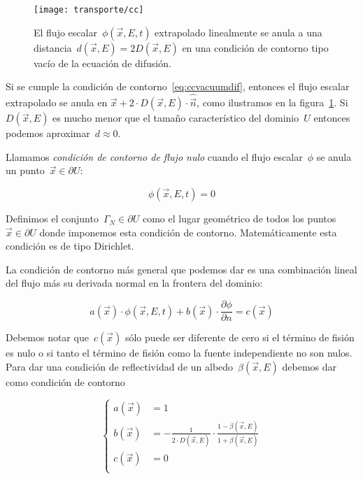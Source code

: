 \begin{figure}
\begin{center}
 \texttt{[image: transporte/cc]}
\end{center}
\caption{\label{fig:cc} El flujo escalar~$\phi(\vec{x}, E,t)$ extrapolado linealmente se anula a una distancia~$d(\vec{x},E)= 2D(\vec{x},E)$ en una condición de contorno tipo vacío de la ecuación de difusión.}
\end{figure}

Si se cumple la condición de contorno~\eqref{eq:ccvacuumdif}, entonces el flujo escalar extrapolado se anula en $\vec{x} + 2 \cdot D(\vec{x}, E) \cdot \hat{\vec{n}}$, como ilustramos en la figura~\ref{fig:cc}. Si~$D(\vec{x}, E)$ es mucho menor que el tamaño característico del dominio~$U$ entonces podemos aproximar~$d \approx 0$.

\begin{definicion}
\label{def:ccnulldif}
Llamamos \emph{condición de contorno de flujo nulo} cuando el flujo escalar~$\phi$ se anula un punto~$\vec{x} \in \partial U$:

\begin{equation*}
\phi(\vec{x}, E, t) = 0
\end{equation*}

Definimos el conjunto~$\Gamma_N \in \partial U$ como el lugar geométrico de todos los puntos~$\vec{x} \in \partial U$ donde imponemos esta condición de contorno. Matemáticamente esta condición es de tipo Dirichlet.
\end{definicion}


\medskip

La condición de contorno más general que podemos dar es una combinación lineal del flujo más su derivada normal en la frontera del dominio:

\begin{equation*}
 a(\vec{x}) \cdot \phi(\vec{x},E,t) + b(\vec{x}) \cdot \frac{\partial \phi}{\partial n} = c(\vec{x})
\end{equation*}

Debemos notar que~$c(\vec{x})$ sólo puede ser diferente de cero si el término de fisión es nulo o si tanto el término de fisión como la fuente independiente no son nulos. Para dar una condición de reflectividad de un albedo~$\beta(\vec{x}, E)$ debemos dar como condición de contorno

\begin{equation*}
\begin{cases}
 a(\vec{x}) &= 1 \\
 b(\vec{x}) &= \displaystyle - \frac{1}{2\cdot D(\vec{x},E)} \cdot \frac{1 - \beta(\vec{x}, E)}{1 + \beta(\vec{x},E)} \\
 c(\vec{x}) &= 0 \\
\end{cases}
 \end{equation*}



